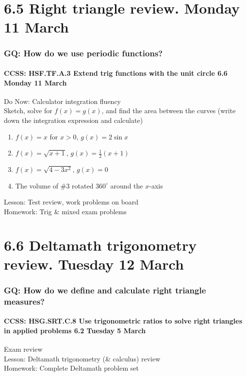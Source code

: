 \documentclass{beamer}
\begin{document}
\section{6.5 Right triangle review. Monday 11 March}
  \frame
  {
    \frametitle{GQ: How do we use periodic functions?}
    \framesubtitle{CCSS: HSF.TF.A.3 Extend trig functions with the unit circle  \hfill \alert{6.6 Monday 11 March}}

    \begin{block}{Do Now: Calculator integration fluency\\
      Sketch, solve for $f(x)=g(x)$, and find the area between the curves (write down the integration expression and calculate)}
      \begin{enumerate}
        \item $f(x)=x$ for $x>0$, $g(x)=2 \sin x$
        \item $f(x)=\sqrt{x+1}$, $g(x)=\frac{1}{2}(x+1)$
        \item $f(x)=\sqrt{4-3x^2}$, $g(x)=0$
        \item The volume of \#3 rotated $360^\circ$ around the $x$-axis
      \end{enumerate}
      \end{block}
    Lesson: Test review, work problems on board\\%
    Homework: Trig \& mixed exam problems
  }

\section{6.6 Deltamath trigonometry review. Tuesday 12 March}
  \frame
  {
    \frametitle{GQ: How do we define and calculate right triangle measures?}
    \framesubtitle{CCSS: HSG.SRT.C.8 Use trigonometric ratios to solve right triangles in applied problems \hfill \alert{6.2 Tuesday 5 March}}

    Exam review\\
    Lesson: Deltamath trigonometry (\& calculus) review\\
    Homework: Complete Deltamath problem set
  }
\end{document}
